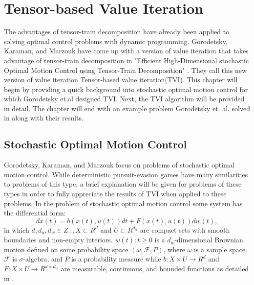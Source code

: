 \chapter{Tensor-based Value Iteration}\label{chp:tvi}

The advantages of tensor-train decomposition have already been applied to solving optimal control problems with dynamic programming. Gorodetsky, Karaman, and Marzouk have come up with a version of value iteration that takes advantage of tensor-train decomposition in "Efficient High-Dimensional stochastic Optimal Motion Control using Tensor-Train Decomposition" \cite{Gorod}. They call this new version of value iteration Tensor-based value iteration(TVI). This chapter will begin by providing a quick background into stochastic optimal motion control for which Gorodetsky et.al designed TVI. Next, the TVI algorithm will be provided in detail. The chapter will end with an example problem Gorodetsky et. al. solved in \cite{Gorod} along with their results. 

\section{Stochastic Optimal Motion Control}
Gorodetsky, Karaman, and Marzouk focus on problems of stochastic optimal motion control. While deterministic pursuit-evasion games have many similarities to problems of this type, a brief explanation will be given for problems of these types in order to fully appreciate the results of TVI when applied to these problems. In the problem of stochastic optimal motion control some system has the differential form:
\begin{equation}\label{eqn7}
dx(t) = b(x(t),u(t))dt + F(x(t),u(t))dw(t),
\end{equation}
in which $d,d_u,d_w \in Z_+, X \subset R^d$ and $U \subset R^{d_u}$ are compact sets with smooth  boundaries and non-empty interiors. ${w(t):t \geq 0}$ is a $d_w$-dimensional Brownian motion defined on some probability space $(\omega, \mathscr{F},P)$, where $\omega$ is a sample space. $\mathscr{F}$ is $\sigma$-algebra, and $P$ is a probability measure while $b:X \times U \rightarrow R^d$ and $F: X \times U \rightarrow R^{d \times d_w}$ are measurable, continuous, and bounded functions as detailed in \cite{Gorod}. 

